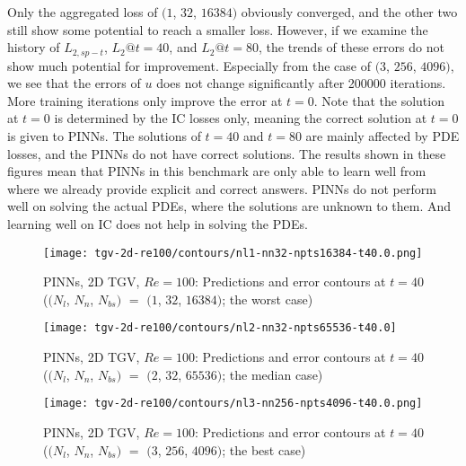 Only the aggregated loss of $(1$, $32$, $16384)$ obviously converged, and the other two still show some potential to reach a smaller loss.
However, if we examine the history of $L_{2,sp-t}$, $L_2@t=40$, and $L_2@t=80$, the trends of these errors do not show much potential for improvement.
Especially from the case of $(3$, $256$, $4096)$, we see that the errors of $u$ does not change significantly after \num{200000} iterations.
More training iterations only improve the error at $t=0$.
Note that the solution at $t=0$ is determined by the IC losses only, meaning the correct solution at $t=0$ is given to PINNs.
The solutions of $t=40$ and $t=80$ are mainly affected by PDE losses, and the PINNs do not have correct solutions.
The results shown in these figures mean that PINNs in this benchmark are only able to learn well from where we already provide explicit and correct answers.
PINNs do not perform well on solving the actual PDEs, where the solutions are unknown to them.
And learning well on IC does not help in solving the PDEs.

\begin{figure}[hbt!]
    \centering%
    \texttt{[image: tgv-2d-re100/contours/nl1-nn32-npts16384-t40.0.png]}
    \caption[%
        PINNs, 2D TGV, $Re=100$: Predictions and error contours at $t=40$ ($(N_l$, $N_n$, $N_{bs})$ $=$ $(1$, $32$, $16384)$; the worst case)%
    ]{%
        PINNs, 2D TGV, $Re=100$: Predictions and error contours at $t=40$ ($(N_l$, $N_n$, $N_{bs})$ $=$ $(1$, $32$, $16384)$; the worst case)%
    }
    \label{fig:nl1-nn32-npts16384-t40-contours}
\end{figure}

\begin{figure}[hbt!]
    \centering%
    \texttt{[image: tgv-2d-re100/contours/nl2-nn32-npts65536-t40.0]}
    \caption[%
        PINNs, 2D TGV, $Re=100$: Predictions and error contours at $t=40$ ($(N_l$, $N_n$, $N_{bs})$ $=$ $(2$, $32$, $65536)$; the median case)%
    ]{%
        PINNs, 2D TGV, $Re=100$: Predictions and error contours at $t=40$ ($(N_l$, $N_n$, $N_{bs})$ $=$ $(2$, $32$, $65536)$; the median case)%
    }
    \label{fig:nl2-nn32-npts65536-t40-contours}
\end{figure}

\begin{figure}[hbt!]
    \centering%
    \texttt{[image: tgv-2d-re100/contours/nl3-nn256-npts4096-t40.0.png]}
    \caption[%
        PINNs, 2D TGV, $Re=100$: Predictions and error contours at $t=40$ ($(N_l$, $N_n$, $N_{bs})$ $=$ $(3$, $256$, $4096)$; the best case)%
    ]{%
        PINNs, 2D TGV, $Re=100$: Predictions and error contours at $t=40$ ($(N_l$, $N_n$, $N_{bs})$ $=$ $(3$, $256$, $4096)$; the best case)%
    }
    \label{fig:nl3-nn256-npts4096-t40-contours}
\end{figure}

